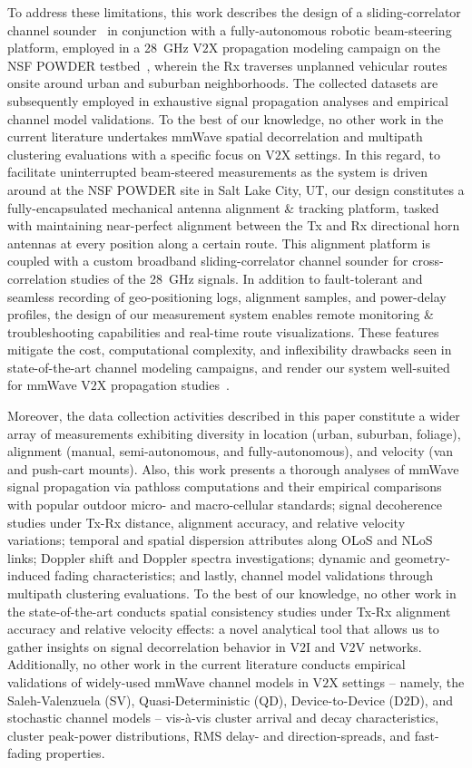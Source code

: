 \documentclass[12pt, draftcls, onecolumn]{IEEEtran}
\begin{document}
To address these limitations, this work describes the design of a sliding-correlator channel sounder~\cite{Sounder} in conjunction with a fully-autonomous robotic beam-steering platform, employed in a \SI{28}{\giga\hertz} V$2$X propagation modeling campaign on the NSF POWDER testbed~\cite{POWDER, POWDER_RF}, wherein the Rx traverses unplanned vehicular routes onsite around urban and suburban neighborhoods. The collected datasets are subsequently employed in exhaustive signal propagation analyses and empirical channel model validations. To the best of our knowledge, no other work in the current literature undertakes mmWave spatial decorrelation and multipath clustering evaluations with a specific focus on V$2$X settings. In this regard, to facilitate uninterrupted beam-steered measurements as the system is driven around at the NSF POWDER site in Salt Lake City, UT, our design constitutes a fully-encapsulated mechanical antenna alignment \& tracking platform, tasked with maintaining near-perfect alignment between the Tx and Rx directional horn antennas at every position along a certain route. This alignment platform is coupled with a custom broadband sliding-correlator channel sounder for cross-correlation studies of the \SI{28}{\giga\hertz} signals. In addition to fault-tolerant and seamless recording of geo-positioning logs, alignment samples, and power-delay profiles, the design of our measurement system enables remote monitoring \& troubleshooting capabilities and real-time route visualizations. These features mitigate the cost, computational complexity, and inflexibility drawbacks seen in state-of-the-art channel modeling campaigns, and render our system well-suited for mmWave V$2$X propagation studies~\cite{SPAVE_ICC}.

Moreover, the data collection activities described in this paper constitute a wider array of measurements exhibiting diversity in location (urban, suburban, foliage), alignment (manual, semi-autonomous, and fully-autonomous), and velocity (van and push-cart mounts). Also, this work presents a thorough analyses of mmWave signal propagation via pathloss computations and their empirical comparisons with popular outdoor micro- and macro-cellular standards; signal decoherence studies under Tx-Rx distance, alignment accuracy, and relative velocity variations; temporal and spatial dispersion attributes along OLoS and NLoS links; Doppler shift and Doppler spectra investigations; dynamic and geometry-induced fading characteristics; and lastly, channel model validations through multipath clustering evaluations. To the best of our knowledge, no other work in the state-of-the-art conducts spatial consistency studies under Tx-Rx alignment accuracy and relative velocity effects: a novel analytical tool that allows us to gather insights on signal decorrelation behavior in V$2$I and V$2$V networks. Additionally, no other work in the current literature conducts empirical validations of widely-used mmWave channel models in V$2$X settings -- namely, the Saleh-Valenzuela (SV), Quasi-Deterministic (QD), Device-to-Device (D$2$D), and stochastic channel models -- vis-\`{a}-vis cluster arrival and decay characteristics, cluster peak-power distributions, RMS delay- and direction-spreads, and fast-fading properties.
\end{document}
